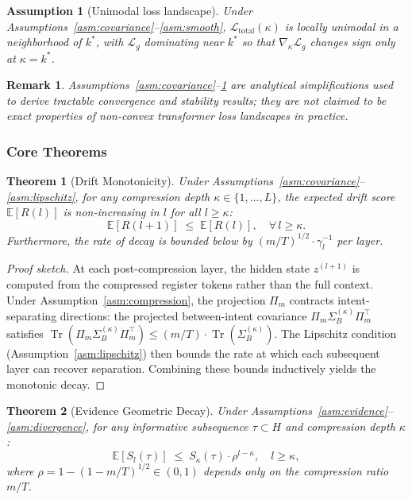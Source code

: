 \documentclass[lettersize,journal]{IEEEtran}
\newtheorem{theorem}{Theorem}
\newtheorem{assumption}{Assumption}
\newtheorem{remark}{Remark}
\newcommand{\E}{\mathbb{E}}
\newcommand{\Tr}{\operatorname{Tr}}
\newcommand{\calL}{\mathcal{L}}
\begin{document}
\begin{assumption}[Unimodal loss landscape]
\label{asm:unimodal}
Under Assumptions~\ref{asm:covariance}--\ref{asm:smooth},
$\calL_{\text{total}}(\kappa)$ is locally unimodal in a neighborhood of
$k^*$, with $\calL_g$ dominating near $k^*$ so that
$\nabla_\kappa \calL_g$ changes sign only at $\kappa = k^*$.
\end{assumption}

\begin{remark}
Assumptions~\ref{asm:covariance}--\ref{asm:unimodal} are analytical
simplifications used to derive tractable convergence and stability
results; they are not claimed to be exact properties of non-convex
transformer loss landscapes in practice.
\end{remark}

\subsubsection{Core Theorems}

\begin{theorem}[Drift Monotonicity]
\label{thm:collapse_monotone}
Under Assumptions~\ref{asm:covariance}--\ref{asm:lipschitz},
for any compression depth $\kappa \in \{1,\ldots,L\}$,
the expected drift score $\E[R(l)]$ is non-increasing in $l$
for all $l \geq \kappa$:
\[
  \E[R(l+1)] \;\leq\; \E[R(l)], \quad \forall\, l \geq \kappa.
\]
Furthermore, the rate of decay is bounded below by
$(m/T)^{1/2} \cdot \gamma_l^{-1}$ per layer.
\end{theorem}

\begin{proof}[Proof sketch]
At each post-compression layer, the hidden state $z^{(l+1)}$
is computed from the compressed register tokens rather than the
full context.
Under Assumption~\ref{asm:compression}, the projection $\Pi_m$
contracts intent-separating directions: the projected between-intent
covariance $\Pi_m \Sigma_B^{(\kappa)} \Pi_m^\top$ satisfies
$\Tr(\Pi_m \Sigma_B^{(\kappa)} \Pi_m^\top)
  \leq (m/T) \cdot \Tr(\Sigma_B^{(\kappa)})$.
The Lipschitz condition (Assumption~\ref{asm:lipschitz}) then bounds
the rate at which each subsequent layer can recover separation.
Combining these bounds inductively yields the monotonic decay.
\end{proof}

\begin{theorem}[Evidence Geometric Decay]
\label{thm:evidence_decay}
Under Assumptions~\ref{asm:evidence}--\ref{asm:divergence},
for any informative subsequence $\tau \subset H$ and compression
depth $\kappa$:
\[
  \E[S_l(\tau)] \;\leq\; S_\kappa(\tau)\cdot\rho^{l-\kappa},
  \quad l \geq \kappa,
\]
where $\rho = 1 - (1 - m/T)^{1/2} \in (0,1)$ depends only on
the compression ratio $m/T$.
\end{theorem}
\end{document}
